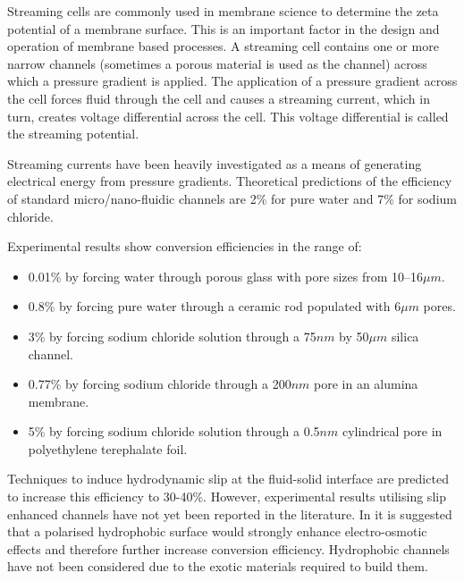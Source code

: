 \documentclass[10pt,final,journal]{IEEEtran}
\begin{document}
    Streaming cells are commonly used in membrane science to determine the zeta potential of a membrane surface.
    This is an important factor in the design and operation of membrane based processes. \cite{Daiguji2004b}
    A streaming cell contains one or more narrow channels (sometimes a porous material is used as the channel) across which a pressure gradient is applied.
    The application of a pressure gradient across the cell forces fluid through the cell and causes a streaming current, which in turn, creates voltage differential across the cell.
    This voltage differential is called the streaming potential.

    Streaming currents have been heavily investigated as a means of generating electrical energy from pressure gradients. \cite{Chang2009,Daiguji2006,Daiguji2004b,Davidson2008a,Davidson2008,CherngHon2012,Jiao2014,Lu2006,Olthuis2005,Osterle1964,Pennathur2007,Ren2008a,VanderHeyden2006,Heyden2007,Xie2008,Yang2003}
    Theoretical predictions of the efficiency of standard micro/nano-fluidic channels are 2\% for pure water and 7\% for sodium chloride. \cite{VanderHeyden2006}
    
    Experimental results show conversion efficiencies in the range of:
    \begin{itemize}
        \item 0.01\% by forcing water through porous glass with pore sizes from 10--16\thinspace$\mu m$.\cite{Yang2003}
        \item 0.8\% by forcing pure water through a ceramic rod populated with 6\thinspace$\mu m$ pores. \cite{Yang2004}
        \item 3\% by forcing sodium chloride solution through a 75\thinspace$nm$ by 50\thinspace$\mu m$ silica channel. \cite{Heyden2007}
        \item 0.77\% by forcing sodium chloride through a 200\thinspace$nm$ pore in an alumina membrane. \cite{Lu2006}
        \item 5\% by forcing sodium chloride solution through a 0.5\thinspace$nm$ cylindrical pore in polyethylene terephalate foil. \cite{Xie2008}
    \end{itemize}

    Techniques to induce hydrodynamic slip at the fluid-solid interface are predicted to increase this efficiency to 30-40\%. \cite{Davidson2008a, Ren2008a}
    However, experimental results utilising slip enhanced channels have not yet been reported in the literature.
    In \cite{Joly2006} it is suggested that a polarised hydrophobic surface would strongly enhance electro-osmotic effects and therefore further increase conversion efficiency.
    Hydrophobic channels have not been considered due to the exotic materials required to build them.
\end{document}
